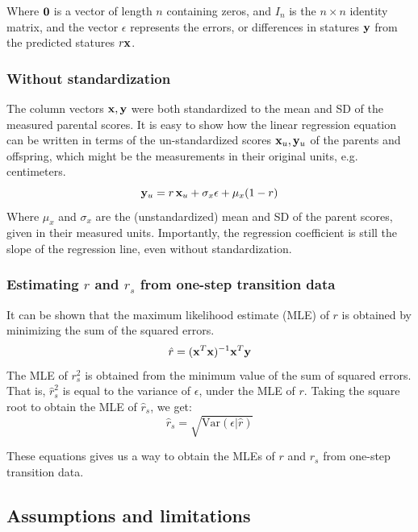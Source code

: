 \documentclass[letterpaper,10pt]{article} %
\begin{document}
Where $\bold{0}$ is a vector of length $n$ containing zeros, and $I_n$ is the $n \times n$ identity matrix, and the vector $\epsilon$ represents the errors, or differences in statures $\bold{y}$ from the predicted statures $r\bold{x}$. 

\subsubsection*{Without standardization}
The column vectors $\bold{x}, \bold{y}$ were both standardized to the mean and SD of the measured parental scores. It is easy to show how the linear regression equation can be written in terms of the un-standardized scores $\bold{x}_u, \bold{y}_u$ of the parents and offspring, which might be the measurements in their original units, e.g. centimeters. 
$$\bold{y}_u =  r \, \bold{x}_u + \sigma_x\bold{\epsilon} +  \mu_x(1-r)$$
Where $\mu_x$ and $\sigma_x$ are the (unstandardized) mean and SD of the parent scores, given in their measured units. Importantly, the regression coefficient is still the slope of the regression line, even without standardization. 


\subsubsection*{Estimating $r$ and $r_s$ from one-step transition data}
It can be shown that the maximum likelihood estimate (MLE) of $r$ is obtained by minimizing the sum of the squared errors. 
%
$$\hat{r} = (\bold{x}^T \bold{x})^{-1} \bold{x}^T \bold{y}$$
%
The MLE of $r_s^2$ is obtained from the minimum value of the sum of squared errors. That is, $\hat{r}_s^2$ is equal to the variance of $\epsilon$, under the MLE of $r$. Taking the square root to obtain the MLE of $\hat{r}_s$, we get:
%
$$\hat{r}_s = \sqrt{\mathrm{Var}({\epsilon} | \hat{r})}$$%

These equations gives us a way to obtain the MLEs of $r$ and $r_s$ from one-step transition data. 



\subsection{Assumptions and limitations}
\end{document}

